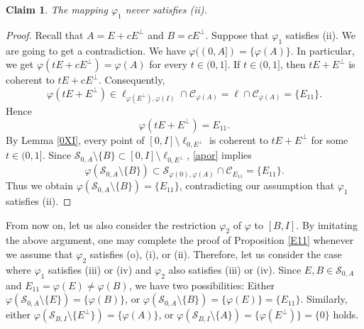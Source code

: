 \documentclass[10pt]{amsart}
\newtheorem{claim}[theorem]{Claim}
\theoremstyle{definition}
\theoremstyle{remark}
\numberwithin{subsection}{section}
\numberwithin{equation}{section}
\newcommand\cC{{\mathcal{C}}}
\begin{document}
\begin{claim}
The mapping  $\varphi_1$ never satisfies (ii). 
\end{claim}
\begin{proof}
Recall that $A=E+cE^\perp$ and $B=cE^\perp$.
Suppose that $\varphi_1$ satisfies (ii). We are going to get a contradiction.
We have $\varphi((0,A])=\{\varphi(A)\}$. In particular, we get $\varphi(tE+cE^\perp)=\varphi(A)$ for every $t\in (0,1]$.
If $t\in (0,1]$, then $tE+E^\perp$ is coherent to $tE+cE^\perp$.
Consequently,
\[
\varphi(tE+E^\perp)\in \ell_{\varphi(E^\perp), \varphi(I)}\cap \cC_{\varphi(A)} =\ell\cap \cC_{\varphi(A)}=\{E_{11}\}.
\]  
Hence 
\begin{equation}\label{apor}
\varphi(tE+E^\perp)=E_{11}.
\end{equation}
By Lemma \ref{0XI}, every point of $[0, I]\setminus \ell_{0, E^\perp}$ is coherent to $tE+E^\perp$ for some $t\in (0,1]$. 
Since $\mathcal{S}_{0, A}\setminus\{B\}\subset [0,I]\setminus \ell_{0, E^\perp}$, \eqref{apor} implies 
\[
\varphi(\mathcal{S}_{0, A}\setminus\{B\})\subset \mathcal{S}_{\varphi(0), \varphi(A)}\cap \cC_{E_{11}}
=\{ E_{11} \}.
\]
Thus we obtain $\varphi(\mathcal{S}_{0, A}\setminus\{B\})=\{E_{11}\}$, contradicting our assumption that $\varphi_1$ satisfies (ii). 
\end{proof}

From now on, let us also consider the restriction $\varphi_2$ of $\varphi$ to $[B, I]$. 
By imitating the above argument, one may complete the proof of Proposition \ref{E11} whenever we assume that $\varphi_2$ satisfies (o),  (i), or (ii). 
Therefore, let us consider the case where $\varphi_1$ satisfies (iii) or (iv) and $\varphi_2$ also satisfies (iii) or (iv).  
Since $E, B\in \mathcal{S}_{0, A}$ and $E_{11}=\varphi(E)\neq \varphi(B)$, we have two possibilities: 
Either $\varphi(\mathcal{S}_{0, A}\setminus\{E\})=\{\varphi(B)\}$, or $\varphi(\mathcal{S}_{0, A}\setminus\{B\})=\{\varphi(E)\}=\{E_{11}\}$.
Similarly, either  $\varphi(\mathcal{S}_{B, I}\setminus\{{E^\perp}\})=\{\varphi(A)\}$, or $\varphi(\mathcal{S}_{B, I}\setminus\{A\})=\{\varphi(E^\perp)\}=\{0\}$ holds.
\end{document}
